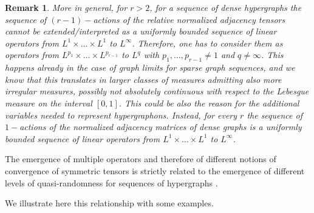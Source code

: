 \documentclass[11pt]{article}
\newtheorem{remark}[theorem]{Remark}
\begin{document}
\endproof
\begin{remark}
More in general, for $r>2$, for a sequence of dense hypergraphs the sequence of $(r-1)-$actions of the relative normalized adjacency tensors cannot be extended/interpreted as a uniformly bounded sequence of linear operators from $L^1\times \ldots \times L^1$ to $L^{\infty}$. Therefore, one has to consider them as operators from $L^{p_1}\times \ldots \times L^{p_{r-1}}$ to $L^q$ with $p_1,\ldots,p_{r-1}\neq 1$ and $q\neq \infty$. This happens already in the case of graph limits for sparse graph sequences, and we know that this translates in larger classes of measures admitting also more irregular measures, possibly not absolutely continuous with respect to the Lebesgue measure on the interval $[0,1]$. This could be also the reason for the additional variables needed to represent hypergraphons. 
Instead, for every $r$ the sequence of $1-$actions of the normalized adjacency matrices of dense graphs is a uniformly bounded sequence of linear operators from $L^1\times \ldots \times L^1$ to $L^{\infty}$.
\end{remark}



The emergence of multiple operators and therefore of different notions of convergence of symmetric tensors is strictly related to the emergence of different levels of quasi-randomness for sequences of hypergraphs \cite{RandomneLimitTow,QuasirandHyp1,QuasirandHyp2}.

We illustrate here this relationship with some examples.
\end{document}

